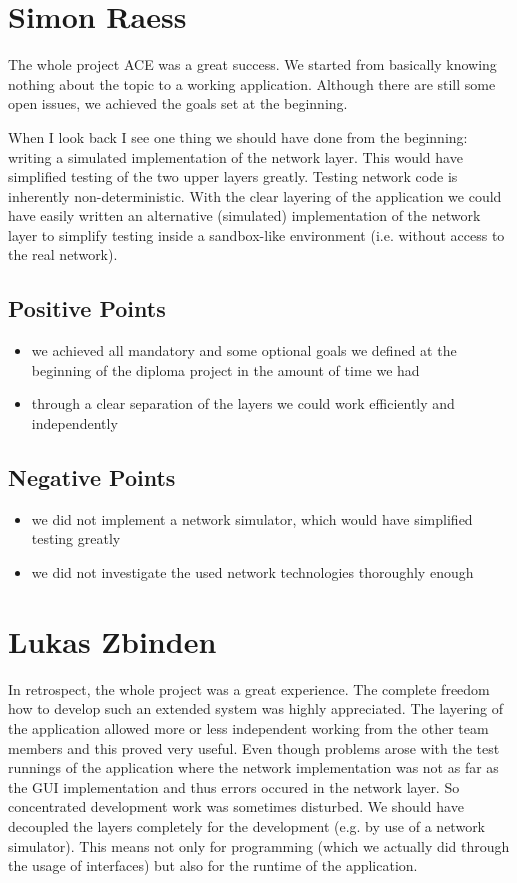 \section{Simon Raess}
The whole project ACE was a great success. We started from basically knowing
nothing about the topic to a working application. Although there are still
some open issues, we achieved the goals set at the beginning. 

When I look back I see one thing we should have done from the beginning:
writing a simulated implementation of the network layer. This would have
simplified testing of the two upper layers greatly. Testing network code is inherently non-deterministic. With the clear layering of the application 
we could have easily written an alternative (simulated) implementation of
the network layer to simplify testing inside a sandbox-like environment (i.e.
without access to the real network).

\subsection{Positive Points}
\begin{itemize}
 \item we achieved all mandatory and some optional goals we defined at the beginning of the diploma project in the amount of time we had
 \item through a clear separation of the layers we could work efficiently and independently
\end{itemize}

\subsection{Negative Points}
\begin{itemize}
 \item we did not implement a network simulator, which would have simplified testing greatly
 \item we did not investigate the used network technologies thoroughly enough
\end{itemize}



\section{Lukas Zbinden}
In retrospect, the whole project was a great experience. The complete freedom how to develop such an extended system was highly appreciated. The layering of the application allowed more or less independent working from the other team members and this proved very useful. Even though problems arose with the test runnings of the application where the network implementation was not as far as the GUI implementation and thus errors occured in the network layer. So concentrated development work was sometimes disturbed. We should have decoupled the layers completely for the development (e.g. by use of a network simulator). This means not only for programming (which we actually did through the usage of interfaces) but also for the runtime of the application.



